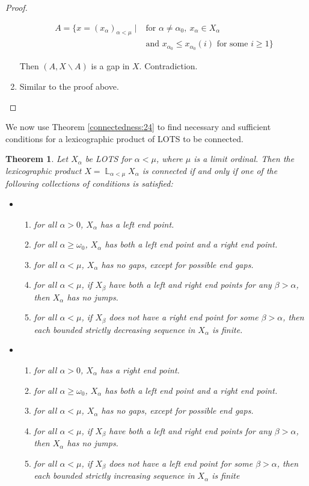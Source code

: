 \documentclass[12pt,oneside,english]{amsbook}
\numberwithin{equation}{section} %
\numberwithin{figure}{section} %
\theoremstyle{plain}
\numberwithin{section}{chapter}
\newtheorem{thm}{Theorem}[section]
\theoremstyle{plain}
\DeclareMathOperator{\LP}{\mathbb{L}}
\begin{document}
\begin{proof}
\begin{enumerate}
    \begin{align*}
      A = \{ x = (x_{\alpha})_{\alpha < \mu} \; | \; & \text{for } \alpha \neq \alpha_0, \ x_{\alpha} \in X_{\alpha}  \\
      &\text{and } x_{\alpha_0} \leq x_{\alpha_0}(i) \text{ for some } i \geq 1 \}
    \end{align*}
   
    Then $(A, X \backslash A)$ is a gap in $X$. Contradiction.
  \item Similar to the proof above.
  \end{enumerate}
\end{proof}

We now use Theorem \ref{connectedness:24} to find necessary and sufficient conditions for a lexicographic product of LOTS to be connected.
\begin{thm}\label{lp:thm:2}
  Let $X_{\alpha}$ be LOTS for $\alpha < \mu$, where $\mu$ is a limit ordinal. Then the lexicographic product $X = \LP_{\alpha < \mu}X_{\alpha}$ is connected if and only if one of the following collections of conditions is satisfied:
  \begin{itemize}
  \item
    \begin{enumerate}
    \item for all $ \alpha > 0$, $X_{\alpha}$ has a left end point.
    \item for all $ \alpha \geq \omega_{0}$, $X_{\alpha}$ has both a left end point and a right end point.
    \item for all $ \alpha < \mu$, $X_{\alpha}$ has no gaps, except for possible end gaps.
    \item for all $ \alpha < \mu$, if $X_{\beta}$ have both a left and right end points for any $\beta > \alpha$, then $X_{\alpha}$ has no jumps.
    \item for all $ \alpha < \mu$, if $X_{\beta}$ does not have a right end point for some $\beta > \alpha$, then each bounded strictly decreasing sequence in $X_{\alpha}$ is finite.
    \end{enumerate}
  \item
    \begin{enumerate}
    \item for all $ \alpha > 0$, $X_{\alpha}$ has a right end point.
    \item for all $ \alpha \geq \omega_{0}$, $X_{\alpha}$ has both a left end point and a right end point.
    \item for all $ \alpha < \mu$, $X_{\alpha}$ has no gaps, except for possible end gaps.
    \item for all $ \alpha < \mu$, if $X_{\beta}$ have both a left and right end points for any $\beta > \alpha$, then $X_{\alpha}$ has no jumps.
    \item for all $ \alpha < \mu$, if $X_{\beta}$ does not have a left end point for some $\beta > \alpha$, then each bounded strictly increasing sequence in $X_{\alpha}$ is finite
    \end{enumerate}
  \end{itemize}
\end{thm}
\end{document}
